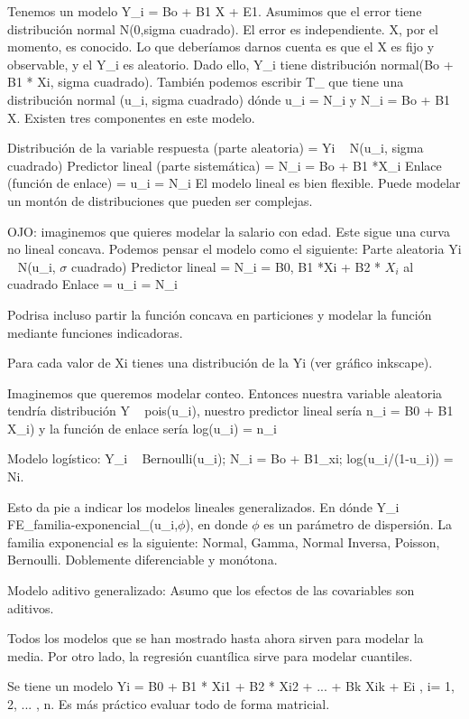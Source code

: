 \documentclass{article}
\begin{document}
Tenemos un modelo Y_i = Bo + B1 X + E1. Asumimos que el error tiene distribución normal N(0,sigma cuadrado). El error es independiente. X, por el momento, es conocido. Lo que deberíamos darnos cuenta es que el X es fijo y observable, y el Y_i es aleatorio. Dado ello, Y_i tiene distribución normal(Bo + B1 * Xi, sigma cuadrado). También podemos escribir T_ que tiene una distribución normal (u_i, sigma cuadrado) dónde u_i = N_i y N_i = Bo + B1 X. Existen tres componentes en este modelo.

Distribución de la variable respuesta (parte aleatoria) = Yi ~ N(u_i, sigma cuadrado)
Predictor lineal (parte sistemática) = N_i = Bo + B1 *X_i
Enlace (función de enlace) = u_i = N_i
El modelo lineal es bien flexible. Puede modelar un montón de distribuciones que pueden ser complejas.

OJO: imaginemos que quieres modelar la salario con edad. Este sigue una curva no lineal concava. Podemos pensar el modelo como el siguiente:
Parte aleatoria Yi ~ N(u_i, $\sigma$ cuadrado)
Predictor lineal = N_i = B0, B1 *Xi + B2 * $X_{i}$ al cuadrado
Enlace = u_i = N_i

Podrisa incluso partir la función concava en particiones y modelar la función mediante funciones indicadoras.

Para cada valor de Xi tienes una distribución de la Yi (ver gráfico inkscape).

Imaginemos que queremos modelar conteo. Entonces nuestra variable aleatoria tendría distribución Y ~ pois(u_i), nuestro predictor lineal sería n_i = B0 + B1 X_i) y la función de enlace sería log(u_i) = n_i

Modelo logístico: Y_i ~ Bernoulli(u_i); N_i = Bo + B1_xi; log(u_i/(1-u_i)) = Ni.

Esto da pie a indicar los modelos lineales generalizados. En dónde Y_i ~ FE_familia-exponencial_(u_i,$\phi$), en donde $\phi$ es un parámetro de dispersión.
La familia exponencial es la siguiente: Normal, Gamma, Normal Inversa, Poisson, Bernoulli. Doblemente diferenciable y monótona.

Modelo aditivo generalizado: Asumo que los efectos de las covariables son aditivos.

Todos los modelos que se han mostrado hasta ahora sirven para modelar la media. Por otro lado, la regresión cuantílica sirve para modelar cuantiles.

Se tiene un modelo Yi = B0 + B1 * Xi1 + B2 * Xi2 + ... + Bk Xik + Ei , i= 1, 2, ... , n. Es más práctico evaluar todo de forma matricial.
\end{document}
